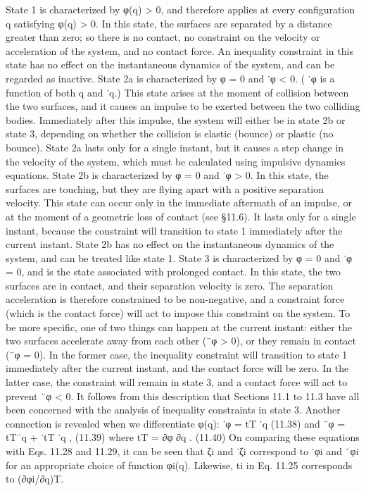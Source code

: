 State 1 is characterized by φ(q) > 0, and therefore applies at every configuration q satisfying φ(q) > 0. In this state, the surfaces are separated by a distance greater than zero; so there is no contact, no constraint on the velocity or acceleration of the system, and no contact force. An inequality constraint in this state has no effect on the instantaneous dynamics of the system, and can be regarded as inactive. State 2a is characterized by φ = 0 and ˙φ < 0. ( ˙φ is a function of both q and ˙q.) This state arises at the moment of collision between the two surfaces, and it causes an impulse to be exerted between the two colliding bodies. Immediately after this impulse, the system will either be in state 2b or state 3, depending on whether the collision is elastic (bounce) or plastic (no bounce). State 2a lasts only for a single instant, but it causes a step change in the velocity of the system, which must be calculated using impulsive dynamics equations. State 2b is characterized by φ = 0 and ˙φ > 0. In this state, the surfaces are touching, but they are flying apart with a positive separation velocity. This state can occur only in the immediate aftermath of an impulse, or at the moment of a geometric loss of contact (see §11.6). It lasts only for a single instant, because the constraint will transition to state 1 immediately after the current instant. State 2b has no effect on the instantaneous dynamics of the system, and can be treated like state 1. State 3 is characterized by φ = 0 and ˙φ = 0, and is the state associated with prolonged contact. In this state, the two surfaces are in contact, and their separation velocity is zero. The separation acceleration is therefore constrained to be non-negative, and a constraint force (which is the contact force) will act to impose this constraint on the system. To be more specific, one of two things can happen at the current instant: either the two surfaces accelerate away from each other (¨φ > 0), or they remain in contact (¨φ = 0). In the former case, the inequality constraint will transition to state 1 immediately after the current instant, and the contact force will be zero. In the latter case, the constraint will remain in state 3, and a contact force will act to prevent ¨φ < 0. It follows from this description that Sections 11.1 to 11.3 have all been concerned with the analysis of inequality constraints in state 3. Another connection is revealed when we differentiate φ(q): ˙φ = tT ˙q (11.38) and ¨φ = tT¨q + ˙tT ˙q , (11.39) where tT = ∂φ ∂q . (11.40) On comparing these equations with Eqs. 11.28 and 11.29, it can be seen that ζi and ˙ζi correspond to ˙φi and ¨φi for an appropriate choice of function φi(q). Likewise, ti in Eq. 11.25 corresponds to (∂φi/∂q)T.

